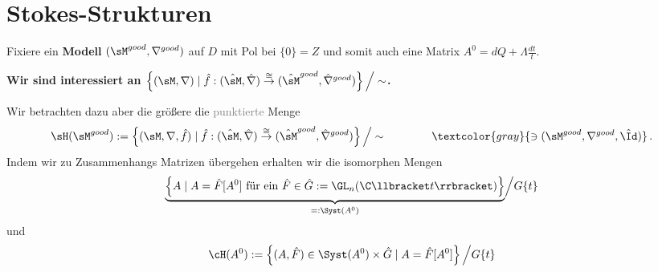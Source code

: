 \section{Stokes-Strukturen} %
Fixiere ein \textbf{Modell} $(\sM^{good},\nabla^{good})$ auf $D$ mit Pol bei
$\{0\}=Z$ und somit auch eine Matrix $A^0=dQ+\Lambda\frac{dt}{t}$.

\begin{center}
  \textbf{Wir sind interessiert an
    $\left\{(\sM,\nabla)
        \mid \hat f:(\hat\sM,\hat\nabla)
          \overset{\cong}\to
          (\hat\sM^{good},\hat\nabla^{good})
      \right\}\Big/\sim$.}
\end{center}
Wir betrachten dazu aber die größere die \textcolor{gray}{punktierte} Menge
\[
  \sH(\sM^{good}):=\left\{(\sM,\nabla,\hat f)
      \mid \hat f:(\hat\sM,\hat\nabla)
        \overset{\cong}\to
        (\hat\sM^{good},\hat\nabla^{good})
    \right\}\Big/\sim
    \qquad \qquad
    \textcolor{gray}{\ni (\sM^{good},\nabla^{good},\hat \Id)}\,.
\]
Indem wir zu Zusammenhangs Matrizen übergehen erhalten wir die isomorphen
Mengen
\[
  \underset{=:\Syst(A^0)}{\underbrace{%
      \left\{A \mid A=\hat F[A^0]\text{~für ein~}\hat F\in\hat G
      :=\GL_n(\C\llbracket t\rrbracket)\right\}
  }}\Big/G\{t\}
\]
und
\[
  \cH(A^0):=\left\{
      (A,\hat F)\in\Syst(A^0)\times\hat G\mid A=\hat F[A^0]
    \right\}\Big/G\{t\}
\]


